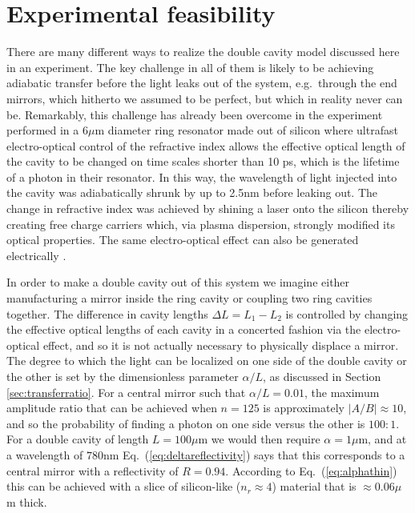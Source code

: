 \documentclass[twocolumn,english,pra,aps,superscriptaddress,floatfix]{revtex4-1}
\begin{document}
\section{Experimental feasibility}
\label{sec:experimentalfeasibility}
There are many different ways to realize the double cavity model discussed here in an experiment. The key challenge in all of them is likely to be achieving adiabatic transfer before the light leaks out of the system, e.g.\ through the end mirrors, which hitherto we assumed to be perfect, but which in reality never can be. Remarkably, this challenge has already been overcome in the experiment \cite{preble07} performed in a $6\mu$m diameter ring resonator made out of silicon where ultrafast electro-optical control of the refractive index allows the effective optical length of the cavity to be changed on time scales shorter than 10 ps, which is the lifetime of a photon in their resonator. In this way, the wavelength of light injected into the cavity was adiabatically shrunk by up to 2.5nm before leaking out. The change in refractive index was achieved by shining a laser onto the silicon thereby creating free charge carriers which, via plasma dispersion, strongly modified its optical properties. The same electro-optical effect can also be generated electrically \cite{xu05}.

In order to make a double cavity out of this system we imagine either manufacturing a mirror inside the ring cavity or coupling two ring cavities together. The difference in cavity lengths $\Delta L=L_{1}-L_{2}$ is controlled by changing the effective optical lengths of each cavity in a concerted fashion via the electro-optical effect, and so it is not actually necessary to physically displace a mirror. The degree to which the light can be localized on one side of the double cavity or the other is set by the dimensionless parameter $\alpha/L$, as discussed in Section \ref{sec:transferratio}. For a central mirror such that $\alpha/L=0.01$, the maximum amplitude  ratio that can be achieved when $n=125$ is approximately $\vert A/B \vert \approx 10$, and so the probability of finding a photon on one side versus the other is $100:1$. For a double cavity of length $L=100 \mu$m we would then require $\alpha=1 \mu$m, and at a wavelength of $780$nm Eq.\ (\ref{eq:deltareflectivity}) says that this corresponds to a central mirror with a reflectivity of $R=0.94$. According to Eq.\ (\ref{eq:alphathin}) this can be achieved with a slice of silicon-like ($n_{r} \approx 4$) material that is $\approx 0.06 \mu$m thick.
\end{document}
